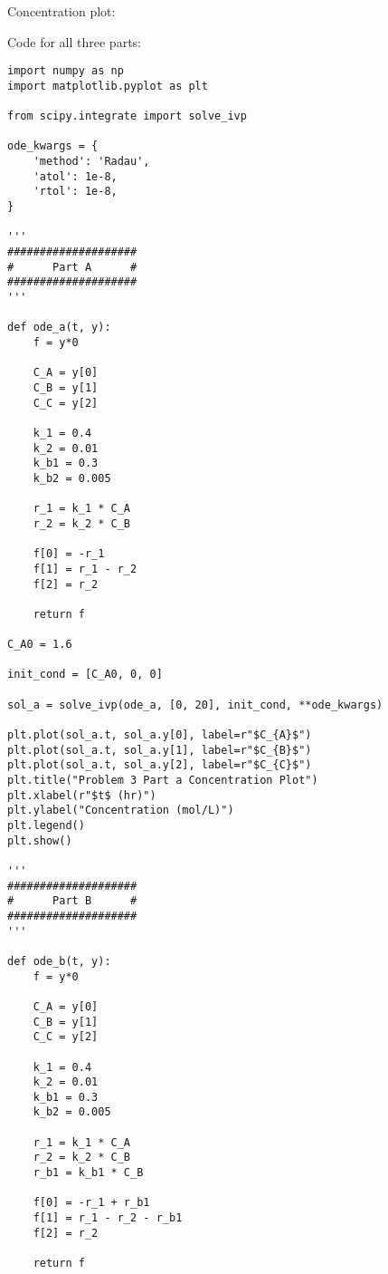 \documentclass[12pt]{article}
\begin{document}
\begin{enumerate}
\begin{enumerate}
        Concentration plot:

        \begin{center}
            
        \end{center}
    \end{enumerate}

    Code for all three parts:

\begin{verbatim}
import numpy as np
import matplotlib.pyplot as plt

from scipy.integrate import solve_ivp

ode_kwargs = {
    'method': 'Radau',
    'atol': 1e-8,
    'rtol': 1e-8,
}

'''
####################
#      Part A      #
####################
'''

def ode_a(t, y):
    f = y*0

    C_A = y[0]
    C_B = y[1]
    C_C = y[2]

    k_1 = 0.4
    k_2 = 0.01
    k_b1 = 0.3
    k_b2 = 0.005

    r_1 = k_1 * C_A
    r_2 = k_2 * C_B

    f[0] = -r_1
    f[1] = r_1 - r_2
    f[2] = r_2

    return f

C_A0 = 1.6

init_cond = [C_A0, 0, 0]

sol_a = solve_ivp(ode_a, [0, 20], init_cond, **ode_kwargs)

plt.plot(sol_a.t, sol_a.y[0], label=r"$C_{A}$")
plt.plot(sol_a.t, sol_a.y[1], label=r"$C_{B}$")
plt.plot(sol_a.t, sol_a.y[2], label=r"$C_{C}$")
plt.title("Problem 3 Part a Concentration Plot")
plt.xlabel(r"$t$ (hr)")
plt.ylabel("Concentration (mol/L)")
plt.legend()
plt.show()

'''
####################
#      Part B      #
####################
'''

def ode_b(t, y):
    f = y*0

    C_A = y[0]
    C_B = y[1]
    C_C = y[2]

    k_1 = 0.4
    k_2 = 0.01
    k_b1 = 0.3
    k_b2 = 0.005

    r_1 = k_1 * C_A
    r_2 = k_2 * C_B
    r_b1 = k_b1 * C_B

    f[0] = -r_1 + r_b1
    f[1] = r_1 - r_2 - r_b1
    f[2] = r_2

    return f


\end{verbatim}
\end{enumerate}
\end{document}
